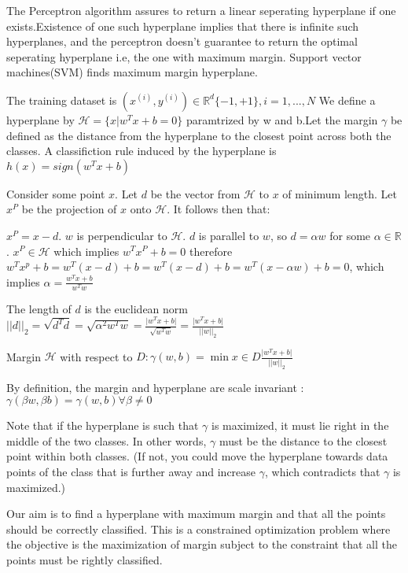 \documentclass[12pt]{article}
\begin{document}
 The Perceptron algorithm assures to return a linear seperating hyperplane if one exists.Existence of one  such  hyperplane implies that there is infinite such hyperplanes, and the perceptron doesn't guarantee to return the optimal seperating hyperplane i.e, the one with maximum margin.
 Support vector machines(SVM) finds maximum margin hyperplane. 
 
 The training dataset is $(x^{(i)}, y^{(i)}) \in \mathbb{R}^{d} \{-1,+1\},i = 1,...,N$ We define a  hyperplane by $\mathcal{H}=\{x \vert w^{T}x + b =0\}$ paramtrized by w and b.Let the margin $\gamma$ be defined as the distance from the hyperplane to the closest point across both the classes. A classifiction rule induced by the hyperplane is $h(x) = sign(w^{T}x+ b)$
 
 
 Consider some point $x$. Let $d$ be the vector from $\mathcal{H}$ to $x$ of minimum length. Let $x^{P}$ be the projection of $x$ onto $\mathcal{H}$. It follows then that:
 
 $x^{P} = x - d.$
 $w$ is perpendicular to $\mathcal{H}$. $d$ is parallel to $w$,  so $d = \alpha w$ for some $\alpha \in \mathbb{R}$. $x^{P} \in \mathcal{H}$ which implies $w^{T}x^{P} + b =0$
 therefore\\  $w^{T}x^{p} + b = w^{T}(x-d) + b = w^{T}(x-d) + b = w^{T}(x-\alpha w) + b =0$, which implies $\alpha = \frac{w^{T}x + b}{w^{T}w}$
 
 The length of $d$ is the euclidean norm \\$\vert \vert d \vert \vert_{2} = \sqrt{d^{T}d} = \sqrt{\alpha ^{2}w^{T}w} = \frac{\vert w^{T}x +b \vert}{\sqrt{w^{T}w}} = \frac{\vert w^{T}x + b \vert}{\vert \vert w \vert \vert_{2}}$
 
 Margin $\mathcal{H}$ with respect to $D:\gamma(w,b) = \min{x \in D} \frac{\vert w^{T}x + b \vert }  {\vert \vert w \vert \vert_{2}}$
 
 By definition, the margin and hyperplane are scale invariant : $\gamma(\beta w,\beta b) = \gamma (w,b) \forall \beta \neq 0$
 
 
 Note that if the hyperplane is such that $\gamma$ is maximized, it must lie right in the middle of the two classes. In other words, $\gamma$ must be the distance to the closest point within both classes. (If not, you could move the hyperplane towards data points of the class that is further away and increase $\gamma$, which contradicts that $\gamma$ is maximized.)
 
 
 
 
 Our aim is to find a hyperplane with maximum margin and  that all the points should be  correctly classified. This is a constrained optimization problem where the objective is the maximization of margin subject to the constraint that all the points must  be rightly classified.
 
\end{document}
